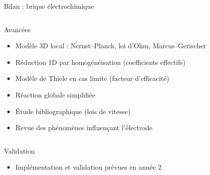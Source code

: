 
\begin{frame}[t]{Bilan : brique électrochimique}
  \vspace{0.3em}
  \begin{columns}[T,onlytextwidth]
    \column{\textwidth}
      \begin{pcbanner}{Avancées}
        \begin{itemize}\footnotesize
          \item Modèle 3D local : Nernst--Planck, loi d'Ohm, Marcus--Gerischer
          \item Réduction 1D par homogénéisation (coefficients effectifs)
          \item Modèle de Thiele en cas limite (facteur d'efficacité)
          \item Réaction globale simplifiée  
          \item Étude bibliographique (lois de vitesse)
          \item Revue des phénomènes influençant l'électrode
        \end{itemize}
      \end{pcbanner}
  \end{columns}

  \vspace{0.3em}
  \begin{columns}[T,onlytextwidth]
    \column{\textwidth}
      \begin{pcbanner}{Validation}
        \begin{itemize}\footnotesize
          \item Implémentation et validation prévues en année 2
        \end{itemize}
      \end{pcbanner}
  \end{columns}
\end{frame}